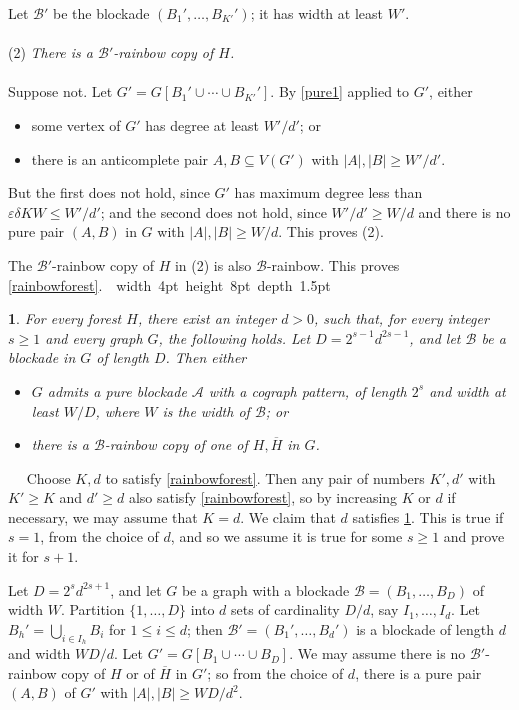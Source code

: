 \documentclass[titlepage,11pt]{article}
\newcommand\blackslug{\hbox{\hskip 1pt \vrule width 4pt height 8pt depth 1.5pt
        \hskip 1pt}}
\newcommand\bbox{\hfill \quad \blackslug \bigbreak}
\def\ll{,\ldots,}
\def\cupcup{\cup\cdots\cup}
\newcommand{\vare}{\varepsilon}
\newtheorem{thm}{}[section]
\newcommand{\Proof}{\noindent{\bf Proof.}\ \ }
\begin{document}
Let $\mathcal{B}'$ be the blockade $(B_1'\ll B_{K'}')$; it has width at least $W'$. 
\\
\\
(2) {\em There is a $\mathcal{B}'$-rainbow
copy of $H$.}
\\
\\
Suppose not. Let 
$G'=G[B_1'\cupcup B_{K'}']$. By \ref{pure1} applied to $G'$, 
either
\begin{itemize}
\item some vertex of $G'$ has degree at least $W'/d'$; or
\item there is an anticomplete pair $A,B\subseteq V(G')$ with $|A|,|B|\ge W'/d'$.
\end{itemize}
But the first does not hold, since $G'$ has maximum degree less than $\vare\delta KW\le W'/d'$; and the second
does not hold, since $W'/d'\ge W/d$ and there is no pure pair
$(A,B)$ in $G$ with $|A|,|B|\ge  W/d$. This proves (2).

\bigskip
The $\mathcal{B}'$-rainbow copy of $H$ in (2) is also $\mathcal{B}$-rainbow. This proves \ref{rainbowforest}.~\bbox




\begin{thm}\label{blockparty}
For every forest $H$, there exist an integer $d>0$, such that,
for every integer $s\ge 1$ and every graph $G$, the following holds. Let $D=2^{s-1}d^{2s-1}$, and let $\mathcal{B}$ be a 
blockade in $G$ of length $D$. Then 
either
\begin{itemize}
\item
$G$ admits a pure blockade $\mathcal{A}$ with a cograph pattern, of length $2^s$ and width at least $W/D$, 
where $W$ is the width of $\mathcal{B}$; or
\item there is a $\mathcal{B}$-rainbow copy of one of $H,\overline{H}$ in $G$.
\end{itemize}
\end{thm}
\Proof
Choose $K,d$ to satisfy \ref{rainbowforest}. Then any pair of numbers $K',d'$ with $K'\ge K$ and $d'\ge d$ also 
satisfy \ref{rainbowforest}, so by increasing $K$ or $d$ if necessary, we may assume that $K=d$. We claim that $d$ satisfies \ref{blockparty}.
This is true if $s=1$, from the choice of $d$, and so we assume it is true for some $s\ge 1$ and prove it for $s+1$.

Let $D=2^{s}d^{2s+1}$, and let $G$ be a graph with a blockade $\mathcal{B}=(B_1\ll B_D)$ of width $W$. Partition $\{1\ll D\}$
into $d$ sets of cardinality $D/d$, say $I_1\ll I_d$. Let $B_h'=\bigcup_{i\in I_h}B_i$ for $1\le i\le d$; then 
$\mathcal{B}'=(B_1'\ll B_d')$ is a blockade of length $d$ and width $WD/d$. Let $G'=G[B_1\cupcup B_D]$. 
We may assume there is no $\mathcal{B}'$-rainbow copy of 
$H$ or of $\overline{H}$ in $G'$; so from the choice of $d$, there is a pure pair $(A,B)$ of $G'$ with $|A|,|B|\ge WD/d^2$.
\end{document}
